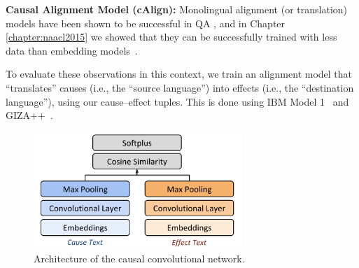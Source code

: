 {\flushleft \textbf{Causal Alignment Model (cAlign):}}
Monolingual alignment (or translation) models have been shown to be successful in QA \citep{Berger:00,Echihabi:03,Soricut:06,Riezler:etal:2007,Surdeanu:11,yao2013}, and in Chapter \ref{chapter:naacl2015} we showed that they can be successfully trained with less data than embedding models~\citep[see also][]{sharp-EtAl:2015:NAACL-HLT}. 

To evaluate these observations in this context, we train an alignment model that ``translates'' causes (i.e., the ``source language'') into effects (i.e., the ``destination language''), using our cause--effect tuples. 
This is done using IBM Model 1~\citep{Brown:93} and GIZA++~\citep{och03}. 

\begin{figure}[t!]
\begin{center}
\includegraphics[width=0.7\textwidth]{mainmatter/emnlp2016-causal/cnn2.png}
\caption{{ Architecture of the causal convolutional network. }}
\label{fig:cnn}
\end{center}
\end{figure}

